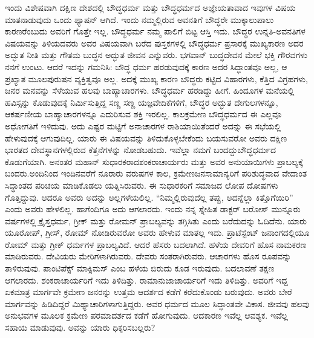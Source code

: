 ಇಂದು ವಿಶೇಷವಾಗಿ ದಕ್ಷಿಣ ದೇಶದಲ್ಲಿ ಬೌದ್ಧಧರ್ಮ ಮತ್ತು ಬೌದ್ಧಧರ್ಮದ ಅಜ್ಞೇಯತಾವಾದ ಇವುಗಳ ವಿಷಯ ಮಾತನಾಡುವುದು ಒಂದು ಫ್ಯಾಷನ್​ ಆಗಿದೆ. ಇಂದು ನಮ್ಮಲ್ಲಿರುವ ಅವನತಿಗೆ ಬೌದ್ಧರೇ ಮುಕ್ಕಾಲುಪಾಲು ಕಾರಣರೆಂಬುದು ಅವರಿಗೆ ಗೊತ್ತೇ ಇಲ್ಲ. ಬೌದ್ಧಧರ್ಮ ನಮ್ಮ ಪಾಲಿಗೆ ಬಿಟ್ಟ ಆಸ್ತಿ ಇದು. ಬೌದ್ಧರ ಉನ್ನತಿ-ಅವನತಿಗಳ ವಿಷಯವನ್ನು ತಿಳಿಯದವರು ಅವರ ವಿಷಯವಾಗಿ ಬರೆದ ಪುಸ್ತಕಗಳಲ್ಲಿ ಬೌದ್ಧಧರ್ಮ ಪ್ರಸಾರಕ್ಕೆ ಮುಖ್ಯಕಾರಣ ಅದರ ಅದ್ಭುತ ನೀತಿ ಮತ್ತು ಗೌತಮ ಬುದ್ಧನ ಅದ್ಭುತ ಜೀವನ ಎನ್ನುವರು. ಭಗವಾನ್​ ಬುದ್ಧದೇವನ ಮೇಲೆ ಭಕ್ತಿ ಗೌರವಗಳು ನನಗೆ ಉಂಟು. ಆದರೆ ಇದನ್ನು ಗಮನಿಸಿ: ಬೌದ್ಧ ಧರ್ಮ ಹರಡುವುದಕ್ಕೆ ಕಾರಣ ಅದರ ಸಿದ್ಧಾಂತವೂ ಅಲ್ಲ, ಆ ಪ್ರಖ್ಯಾತ ಮೂಲಪುರುಷನ ವ್ಯಕ್ತಿತ್ವವೂ ಅಲ್ಲ. ಅದಕ್ಕೆ ಮುಖ್ಯ ಕಾರಣ ಬೌದ್ಧರು ಕಟ್ಟಿದ ವಿಹಾರಗಳು, ಕೆತ್ತಿದ ವಿಗ್ರಹಗಳು, ಜನರ ಮನವನ್ನು ಸೆಳೆಯುವ ಹಲವು ಬಾಹ್ಯಾಚಾರಗಳು. ಬೌದ್ಧಧರ್ಮ ಹರಡಿದ್ದು ಹೀಗೆ. ಹಿಂದೂಗಳ ಮನೆಯಲ್ಲಿ ಹವಿಸ್ಸನ್ನು ಕೊಡುವುದಕ್ಕೆ ನಿರ್ಮಿಸುತ್ತಿದ್ದ ಸಣ್ಣ ಸಣ್ಣ ಯಜ್ಞವೇದಿಕೆಗಳಿಗೆ, ಬೌದ್ಧರ ಅದ್ಭುತ ದೇಗುಲಗಳನ್ನೂ, ಆಕರ್ಷಣೀಯ ಬಾಹ್ಯಾಚಾರಗಳನ್ನೂ ಎದುರಿಸುವ ಶಕ್ತಿ ಇರಲಿಲ್ಲ. ಕಾಲಕ್ರಮೇಣ ಬೌದ್ಧಧರ್ಮದ ಈ ಎಲ್ಲವೂ ಅಧೋಗತಿಗೆ ಇಳಿದುವು. ಅದು ಎಷ್ಟರ ಮಟ್ಟಿಗೆ ಅನಾಚಾರಗಳ ರಾಶಿಯಾಯಿತೆಂದರೆ ಅದನ್ನು ಈ ಸಭೆಯಲ್ಲಿ ಹೇಳುವುದಕ್ಕೆ ಆಗುವುದಿಲ್ಲ. ಯಾರು ಈ ವಿಷಯವನ್ನು ತಿಳಿದುಕೊಳ್ಳಬೇಕೆಂದು ಬಯಸುವರೋ ಅವರು ದಕ್ಷಿಣ ಭಾರತದ ದೇವಸ್ಥಾನಗಳಲ್ಲಿರುವ ಕೆತ್ತನೆಗಳನ್ನು ನೋಡಬಹುದು. ಇವೆಲ್ಲಾ ನಮಗೆ ಬಂದದ್ದು\break ಬೌದ್ಧಧರ್ಮದ ಕೊಡುಗೆಯಾಗಿ. ಅನಂತರ ಮಹಾನ್​ ಸುಧಾರಕರಾದ\break ಶಂಕರಾಚಾರ್ಯರು ಮತ್ತು ಅವರ ಅನುಯಾಯಿಗಳು ಪ್ರಾಬಲ್ಯಕ್ಕೆ ಬಂದರು.\break ಅಂದಿನಿಂದ ಇಂದಿನವರೆಗೆ ನೂರಾರು ವರುಷಗಳ ಕಾಲ, ಕ್ರಮೇಣ\break ಜನಸಾಮಾನ್ಯರಿಗೆ ಪರಿಶುದ್ಧವಾದ ವೇದಾಂತ ಸಿದ್ಧಾಂತದ ಪರಿಚಯ ಮಾಡಿಕೊಡಲು ಯತ್ನಿಸಿರುವರು. ಈ ಸುಧಾರಕರಿಗೆ ಸಮಾಜದ ಲೋಪ ದೋಷಗಳು ಗೊತ್ತಿದ್ದುವು. ಆದರೂ ಅವರು ಅದನ್ನು ಅಲ್ಲಗಳೆಯಲಿಲ್ಲ. “ನಿಮ್ಮಲ್ಲಿರುವುದೆಲ್ಲ ತಪ್ಪು, ಅದನ್ನೆಲ್ಲಾ ಕಿತ್ತೊಗೆಯಿರಿ” ಎಂದು ಅವರು ಹೇಳಲಿಲ್ಲ. ಹಾಗೆಂದಿಗೂ ಅದು ಆಗಲಾರದು. ಇಂದು ನನ್ನ ಸ್ನೇಹಿತ ಡಾಕ್ಟರ್​ ಬರೋಸ್​ ಮುನ್ನೂರು ವರ್ಷಗಳಲ್ಲಿ ಕ್ರೈಸ್ತಧರ್ಮ, ಗ್ರೀಕ್​ ಮತ್ತು ರೋಮನ್​ ಪ್ರಾಬಲ್ಯವನ್ನು ತಗ್ಗಿಸಿತು ಎಂದು ಬರೆದುದನ್ನು ಓದಿದೆನು. ಯಾರು ಯೂರೋಪ್​, ಗ್ರೀಸ್​, ರೋಮ್​ ನೋಡಿರುವರೋ ಅವರು ಹೇಳುವ ಮಾತಲ್ಲ ಇದು. ಪ್ರಾಟೆಸ್ಟೆಂಟ್​ ಜನಾಂಗದಲ್ಲಿಯೂ ರೋಮ್​ ಮತ್ತು ಗ್ರೀಕ್​ ಧರ್ಮಗಳ ಪ್ರಾಬಲ್ಯವಿದೆ. ಆದರೆ ಹೆಸರು ಬದಲಾಗಿದೆ. ಹಳೆಯ ದೇವರಿಗೆ ಹೊಸ ನಾಮಕರಣ ಮಾಡಿರುವರು. ದೇವಿಯರು ಮೇರಿಗಳಾಗಿರುವರು. ದೇವರು ಸಂತರಾಗಿರುವರು. ಆಚಾರಗಳು ಹೊಸ ರೂಪವನ್ನು ತಾಳಿರುವುವು. ಪಾಂಟಿಪೆಕ್ಸ್ ಮಾಕ್ಸಿಮಸ್​ ಎಂಬ ಹಳೆಯ ಬಿರುದು ಕೂಡ ಇರುವುದು. ಬದಲಾವಣೆ ತಕ್ಷಣ ಆಗ\-ಲಾರದು. ಶಂಕರಾಚಾರ್ಯ\-ರಿಗೆ ಇದು ತಿಳಿದಿತ್ತು. ರಾಮಾನುಜಾಚಾರ್ಯರಿಗೆ ಇದು ತಿಳಿದಿತ್ತು. ಅವರಿಗೆ ಇದ್ದ ಏಕಮಾತ್ರ ಮಾರ್ಗವೇ ಕ್ರಮೇಣ ಜನರನ್ನು ಉತ್ತಮ ಆದರ್ಶದ ಕಡೆಗೆ ಕರೆದುಕೊಂಡು ಬರುವುದು. ಅವರು ಬೇರೆ ಮಾರ್ಗವನ್ನು ಹಿಡಿದಿದ್ದರೆ ಮಿಥ್ಯಾಚಾರಿಗಳಾಗುತ್ತಿದ್ದರು. ಅವರ ಧರ್ಮದ ಮೂಲ ಸಿದ್ಧಾಂತವೇ ವಿಕಾಸ. ಜೀವವು ಹಲವು ಅನುಭವಗಳ ಮೂಲಕ ಕ್ರಮೇಣ ಪರಮಾದರ್ಶದ ಕಡೆಗೆ ಹೋಗುವುದು. ಆದಕಾರಣ ಇವೆಲ್ಲ ಆವಶ್ಯಕ. ಇವೆಲ್ಲ ಸಹಾಯ ಮಾಡುವುವು. ಅವನ್ನು ಯಾರು ಧಿಕ್ಕರಿಸಬಲ್ಲರು?

